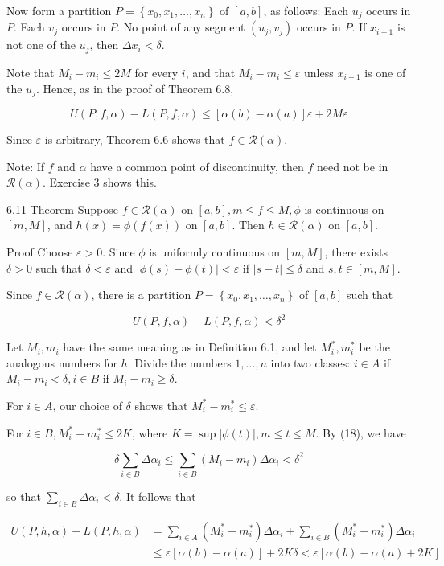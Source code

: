 \documentclass[10pt]{article}
\begin{document}
Now form a partition $P=\left\{x_{0}, x_{1}, \ldots, x_{n}\right\}$ of $[a, b]$, as follows: Each $u_{j}$ occurs in $P$. Each $v_{j}$ occurs in $P$. No point of any segment $\left(u_{j}, v_{j}\right)$ occurs in $P$. If $x_{i-1}$ is not one of the $u_{j}$, then $\Delta x_{i}<\delta$.

Note that $M_{i}-m_{i} \leq 2 M$ for every $i$, and that $M_{i}-m_{i} \leq \varepsilon$ unless $x_{i-1}$ is one of the $u_{j}$. Hence, as in the proof of Theorem 6.8,

$$
U(P, f, \alpha)-L(P, f, \alpha) \leq[\alpha(b)-\alpha(a)] \varepsilon+2 M \varepsilon
$$

Since $\varepsilon$ is arbitrary, Theorem 6.6 shows that $f \in \mathscr{R}(\alpha)$.

Note: If $f$ and $\alpha$ have a common point of discontinuity, then $f$ need not be in $\mathscr{R}(\alpha)$. Exercise 3 shows this.

6.11 Theorem Suppose $f \in \mathscr{R}(\alpha)$ on $[a, b], m \leq f \leq M, \phi$ is continuous on $[m, M]$, and $h(x)=\phi(f(x))$ on $[a, b]$. Then $h \in \mathscr{R}(\alpha)$ on $[a, b]$.

Proof Choose $\varepsilon>0$. Since $\phi$ is uniformly continuous on $[m, M]$, there exists $\delta>0$ such that $\delta<\varepsilon$ and $|\phi(s)-\phi(t)|<\varepsilon$ if $|s-t| \leq \delta$ and $s, t \in[m, M]$.

Since $f \in \mathscr{R}(\alpha)$, there is a partition $P=\left\{x_{0}, x_{1}, \ldots, x_{n}\right\}$ of $[a, b]$ such that

$$
U(P, f, \alpha)-L(P, f, \alpha)<\delta^{2}
$$

Let $M_{i}, m_{i}$ have the same meaning as in Definition 6.1, and let $M_{i}^{*}, m_{i}^{*}$ be the analogous numbers for $h$. Divide the numbers $1, \ldots, n$ into two classes: $i \in A$ if $M_{i}-m_{i}<\delta, i \in B$ if $M_{i}-m_{i} \geq \delta$.

For $i \in A$, our choice of $\delta$ shows that $M_{i}^{*}-m_{i}^{*} \leq \varepsilon$.

For $i \in B, M_{i}^{*}-m_{i}^{*} \leq 2 K$, where $K=\sup |\phi(t)|, m \leq t \leq M$. By (18), we have

$$
\delta \sum_{i \in B} \Delta \alpha_{i} \leq \sum_{i \in B}\left(M_{i}-m_{i}\right) \Delta \alpha_{i}<\delta^{2}
$$

so that $\sum_{i \in B} \Delta \alpha_{i}<\delta$. It follows that

$$
\begin{aligned}
U(P, h, \alpha)-L(P, h, \alpha) & =\sum_{i \in A}\left(M_{i}^{*}-m_{i}^{*}\right) \Delta \alpha_{i}+\sum_{i \in B}\left(M_{i}^{*}-m_{i}^{*}\right) \Delta \alpha_{i} \\
& \leq \varepsilon[\alpha(b)-\alpha(a)]+2 K \delta<\varepsilon[\alpha(b)-\alpha(a)+2 K]
\end{aligned}
$$
\end{document}
